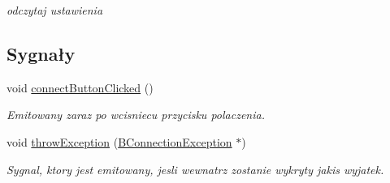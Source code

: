\begin{DoxyCompactItemize}
\begin{DoxyCompactList}\small\item\em odczytaj ustawienia \item\end{DoxyCompactList}\end{DoxyCompactItemize}
\subsection*{Sygnały}
\begin{DoxyCompactItemize}
\item 
void \hyperlink{class_b_connection_widget_a2eef5117ae0e5b76ca02a86d00fbd70a}{connectButtonClicked} ()
\begin{DoxyCompactList}\small\item\em Emitowany zaraz po wcisniecu przycisku polaczenia. \item\end{DoxyCompactList}\item 
void \hyperlink{class_b_connection_widget_a8d14da5ae492c481f88adfbcdabf47d2}{throwException} (\hyperlink{class_b_connection_exception}{BConnectionException} $\ast$)
\begin{DoxyCompactList}\small\item\em Sygnal, ktory jest emitowany, jesli wewnatrz zostanie wykryty jakis wyjatek. \item\end{DoxyCompactList}\end{DoxyCompactItemize}
